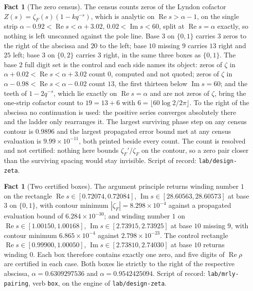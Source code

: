 \documentclass[11pt]{amsart}
\theoremstyle{definition}
\newtheorem{fact}[theorem]{Fact}
\theoremstyle{remark}
\begin{document}
\begin{fact}[The zero census]
\label{fact:count}
The census counts zeros of the Lyndon cofactor $Z(s) = \zeta_{F}(s)(1 - k q^{-s})$, which is analytic on $\operatorname{Re} s > \alpha - 1$, on the single strip $\alpha - 0.92 < \operatorname{Re} s < \alpha + 3.02$, $0.02 < \operatorname{Im} s < 60$, split at $\operatorname{Re} s = \alpha$ exactly, so nothing is left unscanned against the pole line. Base $3$ on $\{0,1\}$ carries $3$ zeros to the right of the abscissa and $20$ to the left; base $10$ missing $9$ carries $13$ right and $25$ left; base $3$ on $\{0,2\}$ carries $3$ right, in the same three boxes as $\{0,1\}$. The base $2$ full digit set is the control and each side names its object: zeros of $\zeta$ in $\alpha + 0.02 < \operatorname{Re} s < \alpha + 3.02$ count $0$, computed and not quoted; zeros of $\zeta$ in $\alpha - 0.98 < \operatorname{Re} s < \alpha - 0.02$ count $13$, the first thirteen below $\operatorname{Im} s = 60$; and the teeth of $1 - 2 q^{-s}$, which lie exactly on $\operatorname{Re} s = \alpha$ and are not zeros of $\zeta$, bring the one-strip cofactor count to $19 = 13 + 6$ with $6 = \lfloor 60 \log 2 / 2\pi \rfloor$. To the right of the abscissa no continuation is used: the positive series converges absolutely there and the ladder only rearranges it. The largest surviving phase step on any census contour is $0.9896$ and the largest propagated error bound met at any census evaluation is $9.99 \times 10^{-11}$, both printed beside every count. The count is resolved and not certified: nothing here bounds $\zeta_{F}'/\zeta_{F}$ on the contour, so a zero pair closer than the surviving spacing would stay invisible. Script of record: \texttt{lab/design-zeta}.
\end{fact}

\begin{fact}[Two certified boxes]
\label{fact:boxes}
The argument principle returns winding number $1$ on the rectangle $\operatorname{Re} s \in [0.72074, 0.72084]$, $\operatorname{Im} s \in [28.60563, 28.60573]$ at base $3$ on $\{0,1\}$, with contour minimum $|\zeta_{F}| = 8.298 \times 10^{-4}$ against a propagated evaluation bound of $6.284 \times 10^{-30}$; and winding number $1$ on $\operatorname{Re} s \in [1.00150, 1.00168]$, $\operatorname{Im} s \in [2.73915, 2.73925]$ at base $10$ missing $9$, with contour minimum $6.865 \times 10^{-4}$ against $2.798 \times 10^{-23}$. The control rectangle $\operatorname{Re} s \in [0.99900, 1.00050]$, $\operatorname{Im} s \in [2.73810, 2.74030]$ at base $10$ returns winding $0$. Each box therefore contains exactly one zero, and five digits of $\operatorname{Re}\rho$ are certified in each case. Both boxes lie strictly to the right of the respective abscissa, $\alpha = 0.6309297536$ and $\alpha = 0.9542425094$. Script of record: \texttt{lab/mrly-pairing}, verb \texttt{box}, on the engine of \texttt{lab/design-zeta}.
\end{fact}
\end{document}
